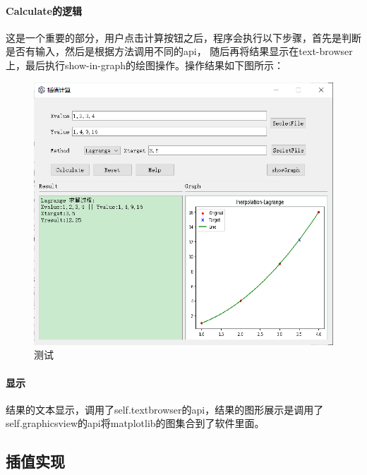 \documentclass[UTF8]{ctexart}
\begin{document}
            \paragraph{Calculate的逻辑}
            这是一个重要的部分，用户点击计算按钮之后，程序会执行以下步骤，首先是判断是否有输入，然后是根据方法调用不同的api，
            随后再将结果显示在text-browser上，最后执行show-in-graph的绘图操作。操作结果如下图所示：
            \begin{figure}[htb]
                \centering
                \includegraphics[scale = 0.5]{test.png}
                \caption{测试}
                \label{fig:test}
            \end{figure}
            \paragraph{显示}
            结果的文本显示，调用了self.textbrowser的api，结果的图形展示是调用了self.graphicsview的api将matplotlib的图集合到了软件里面。
        \subsection{插值实现}
\end{document}
